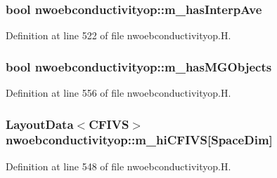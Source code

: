 \subsubsection[{\texorpdfstring{m\+\_\+has\+Interp\+Ave}{m_hasInterpAve}}]{\setlength{\rightskip}{0pt plus 5cm}bool nwoebconductivityop\+::m\+\_\+has\+Interp\+Ave\hspace{0.3cm}{\ttfamily [protected]}}\hypertarget{classnwoebconductivityop_a34865f2a35a1bd4adb7a87b790d066dc}{}\label{classnwoebconductivityop_a34865f2a35a1bd4adb7a87b790d066dc}


Definition at line 522 of file nwoebconductivityop.\+H.

\subsubsection[{\texorpdfstring{m\+\_\+has\+M\+G\+Objects}{m_hasMGObjects}}]{\setlength{\rightskip}{0pt plus 5cm}bool nwoebconductivityop\+::m\+\_\+has\+M\+G\+Objects\hspace{0.3cm}{\ttfamily [protected]}}\hypertarget{classnwoebconductivityop_adad94c8d9fb9a4494f4dacdd5a85a22e}{}\label{classnwoebconductivityop_adad94c8d9fb9a4494f4dacdd5a85a22e}


Definition at line 556 of file nwoebconductivityop.\+H.

\subsubsection[{\texorpdfstring{m\+\_\+hi\+C\+F\+I\+VS}{m_hiCFIVS}}]{\setlength{\rightskip}{0pt plus 5cm}Layout\+Data$<$C\+F\+I\+VS$>$ nwoebconductivityop\+::m\+\_\+hi\+C\+F\+I\+VS\mbox{[}Space\+Dim\mbox{]}\hspace{0.3cm}{\ttfamily [protected]}}\hypertarget{classnwoebconductivityop_a7c16cb39cf7acdb7ea440202002c246c}{}\label{classnwoebconductivityop_a7c16cb39cf7acdb7ea440202002c246c}


Definition at line 548 of file nwoebconductivityop.\+H.

